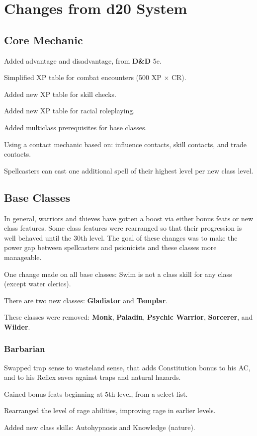 \chapter{Changes from d20 System}
\label{apx:Changes from d20 System}

\section{Core Mechanic}
\begin{itemize*}
\item Added advantage and disadvantage, from \textbf{D\&D} 5e.
\item Simplified XP table for combat encounters (500 XP $\times$ CR).
\item Added new XP table for skill checks.
\item Added new XP table for racial roleplaying.
\item Added multiclass prerequisites for base classes.
\item Using a contact mechanic based on: influence contacts, skill contacts, and trade contacts.
\item Spellcasters can cast one additional spell of their highest level per new class level.
\end{itemize*}

\section{Base Classes}
In general, warriors and thieves have gotten a boost via either bonus feats or new class features. Some class features were rearranged so that their progression is well behaved until the 30th level. The goal of these changes was to make the power gap between spellcasters and psionicists and these classes more manageable.

One change made on all base classes: Swim is not a class skill for any class (except water clerics).

There are two new classes: \textbf{Gladiator} and \textbf{Templar}.

These classes were removed: \textbf{Monk}, \textbf{Paladin}, \textbf{Psychic Warrior}, \textbf{Sorcerer}, and \textbf{Wilder}.

\subsection{Barbarian}
\begin{itemize*}
\item Swapped trap sense to wasteland sense, that adds Constitution bonus to his AC, and to his Reflex saves against traps and natural hazards.
\item Gained bonus feats beginning at 5th level, from a select list.
\item Rearranged the level of rage abilities, improving rage in earlier levels.
\item Added new class skills: Autohypnosis and Knowledge (nature).
\end{itemize*}

